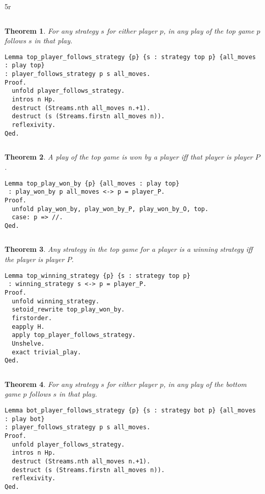 5r\documentclass{article}
\newtheorem{thm}{Theorem}
\theoremstyle{definition}
\begin{document}
$\left.\right.$

\begin{thm}
For any strategy $s$ for either player $p$, in any play of the top game $p$ follows $s$ in that play. 
\end{thm}

\begin{verbatim}
Lemma top_player_follows_strategy {p} {s : strategy top p} {all_moves : play top} 
: player_follows_strategy p s all_moves.
Proof.
  unfold player_follows_strategy.
  intros n Hp.
  destruct (Streams.nth all_moves n.+1).
  destruct (s (Streams.firstn all_moves n)).
  reflexivity.
Qed.
\end{verbatim}

$\left.\right.$

\begin{thm}
A play of the top game is won by a player iff that player is player $P$. 
\end{thm}

\begin{verbatim}
Lemma top_play_won_by {p} {all_moves : play top}
 : play_won_by p all_moves <-> p = player_P.
Proof.
  unfold play_won_by, play_won_by_P, play_won_by_O, top.
  case: p => //.
Qed.
\end{verbatim}

$\left.\right.$

\begin{thm}
Any strategy in the top game for a player is a winning strategy iff the player is player $P$. 
\end{thm}

\begin{verbatim}
Lemma top_winning_strategy {p} {s : strategy top p}
 : winning_strategy s <-> p = player_P.
Proof.
  unfold winning_strategy.
  setoid_rewrite top_play_won_by.
  firstorder.
  eapply H.
  apply top_player_follows_strategy.
  Unshelve.
  exact trivial_play.
Qed. 
\end{verbatim}

$\left.\right.$

\begin{thm}
For any strategy $s$ for either player $p$, in any play of the bottom game $p$ follows $s$ in that play.
\end{thm}


\begin{verbatim}
Lemma bot_player_follows_strategy {p} {s : strategy bot p} {all_moves : play bot} 
: player_follows_strategy p s all_moves.
Proof.
  unfold player_follows_strategy.
  intros n Hp.
  destruct (Streams.nth all_moves n.+1).
  destruct (s (Streams.firstn all_moves n)).
  reflexivity.
Qed.
\end{verbatim}
\end{document}
